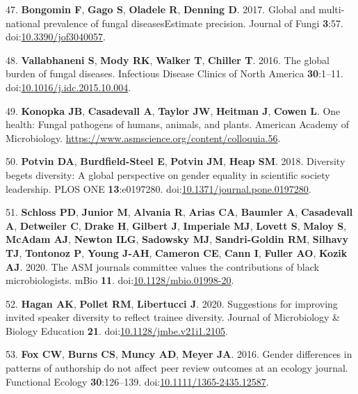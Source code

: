 \documentclass[11pt,]{article}
\begin{document}
\leavevmode\hypertarget{ref-Bongomin2017}{}%
47. \textbf{Bongomin F}, \textbf{Gago S}, \textbf{Oladele R},
\textbf{Denning D}. 2017. Global and multi-national prevalence of fungal
diseasesEstimate precision. Journal of Fungi \textbf{3}:57.
doi:\href{https://doi.org/10.3390/jof3040057}{10.3390/jof3040057}.

\leavevmode\hypertarget{ref-Vallabhaneni2016}{}%
48. \textbf{Vallabhaneni S}, \textbf{Mody RK}, \textbf{Walker T},
\textbf{Chiller T}. 2016. The global burden of fungal diseases.
Infectious Disease Clinics of North America \textbf{30}:1--11.
doi:\href{https://doi.org/10.1016/j.idc.2015.10.004}{10.1016/j.idc.2015.10.004}.

\leavevmode\hypertarget{ref-ASM_2019}{}%
49. \textbf{Konopka JB}, \textbf{Casadevall A}, \textbf{Taylor JW},
\textbf{Heitman J}, \textbf{Cowen L}. One health: Fungal pathogens of
humans, animals, and plants. American Academy of Microbiology.
\url{https://www.asmscience.org/content/colloquia.56}.

\leavevmode\hypertarget{ref-potvin_diversity_2018}{}%
50. \textbf{Potvin DA}, \textbf{Burdfield-Steel E}, \textbf{Potvin JM},
\textbf{Heap SM}. 2018. Diversity begets diversity: A global perspective
on gender equality in scientific society leadership. PLOS ONE
\textbf{13}:e0197280.
doi:\href{https://doi.org/10.1371/journal.pone.0197280}{10.1371/journal.pone.0197280}.

\leavevmode\hypertarget{ref-Schloss2020}{}%
51. \textbf{Schloss PD}, \textbf{Junior M}, \textbf{Alvania R},
\textbf{Arias CA}, \textbf{Baumler A}, \textbf{Casadevall A},
\textbf{Detweiler C}, \textbf{Drake H}, \textbf{Gilbert J},
\textbf{Imperiale MJ}, \textbf{Lovett S}, \textbf{Maloy S},
\textbf{McAdam AJ}, \textbf{Newton ILG}, \textbf{Sadowsky MJ},
\textbf{Sandri-Goldin RM}, \textbf{Silhavy TJ}, \textbf{Tontonoz P},
\textbf{Young J-AH}, \textbf{Cameron CE}, \textbf{Cann I},
\textbf{Fuller AO}, \textbf{Kozik AJ}. 2020. The ASM journals committee
values the contributions of black microbiologists. mBio \textbf{11}.
doi:\href{https://doi.org/10.1128/mbio.01998-20}{10.1128/mbio.01998-20}.

\leavevmode\hypertarget{ref-Hagan2020}{}%
52. \textbf{Hagan AK}, \textbf{Pollet RM}, \textbf{Libertucci J}. 2020.
Suggestions for improving invited speaker diversity to reflect trainee
diversity. Journal of Microbiology \& Biology Education \textbf{21}.
doi:\href{https://doi.org/10.1128/jmbe.v21i1.2105}{10.1128/jmbe.v21i1.2105}.

\leavevmode\hypertarget{ref-fox_gender_2016}{}%
53. \textbf{Fox CW}, \textbf{Burns CS}, \textbf{Muncy AD}, \textbf{Meyer
JA}. 2016. Gender differences in patterns of authorship do not affect
peer review outcomes at an ecology journal. Functional Ecology
\textbf{30}:126--139.
doi:\href{https://doi.org/10.1111/1365-2435.12587}{10.1111/1365-2435.12587}.
\end{document}
